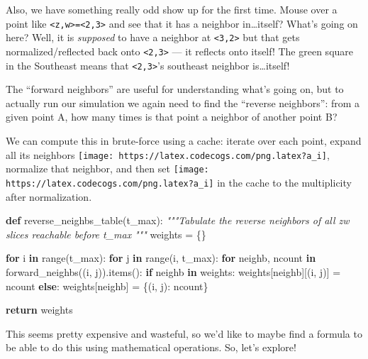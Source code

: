 \documentclass[]{article}
\newenvironment{Shaded}{}{}
\newcommand{\BuiltInTok}[1]{#1}
\newcommand{\CommentTok}[1]{\textcolor[rgb]{0.38,0.63,0.69}{\textit{#1}}}
\newcommand{\ControlFlowTok}[1]{\textcolor[rgb]{0.00,0.44,0.13}{\textbf{#1}}}
\newcommand{\KeywordTok}[1]{\textcolor[rgb]{0.00,0.44,0.13}{\textbf{#1}}}
\newcommand{\NormalTok}[1]{#1}
\newcommand{\OperatorTok}[1]{\textcolor[rgb]{0.40,0.40,0.40}{#1}}
\begin{document}
Also, we have something really odd show up for the first time. Mouse over a
point like \texttt{\textless{}z,w\textgreater{}=\textless{}2,3\textgreater{}}
and see that it has a neighbor in\ldots itself? What's going on here? Well, it
is \emph{supposed} to have a neighbor at \texttt{\textless{}3,2\textgreater{}}
but that gets normalized/reflected back onto
\texttt{\textless{}2,3\textgreater{}} --- it reflects onto itself! The green
square in the Southeast means that \texttt{\textless{}2,3\textgreater{}}'s
southeast neighbor is\ldots itself!

The ``forward neighbors'' are useful for understanding what's going on, but to
actually run our simulation we again need to find the ``reverse neighbors'':
from a given point A, how many times is that point a neighbor of another point
B?

We can compute this in brute-force using a cache: iterate over each point,
expand all its neighbors
\texttt{[image: https://latex.codecogs.com/png.latex?a\_i]}, normalize that
neighbor, and then set
\texttt{[image: https://latex.codecogs.com/png.latex?a\_i]} in the cache to the
multiplicity after normalization.

\begin{Shaded}
\begin{Highlighting}[]
\KeywordTok{def}\NormalTok{ reverse\_neighbs\_table(t\_max):}
    \CommentTok{"""Tabulate the reverse neighbors of all zw slices reachable before t\_max}
\CommentTok{    """}
\NormalTok{    weights }\OperatorTok{=}\NormalTok{ \{\}}

    \ControlFlowTok{for}\NormalTok{ i }\KeywordTok{in} \BuiltInTok{range}\NormalTok{(t\_max):}
        \ControlFlowTok{for}\NormalTok{ j }\KeywordTok{in} \BuiltInTok{range}\NormalTok{(i, t\_max):}
            \ControlFlowTok{for}\NormalTok{ neighb, ncount }\KeywordTok{in}\NormalTok{ forward\_neighbs((i, j)).items():}
                \ControlFlowTok{if}\NormalTok{ neighb }\KeywordTok{in}\NormalTok{ weights:}
\NormalTok{                    weights[neighb][(i, j)] }\OperatorTok{=}\NormalTok{ ncount}
                \ControlFlowTok{else}\NormalTok{:}
\NormalTok{                    weights[neighb] }\OperatorTok{=}\NormalTok{ \{(i, j): ncount\}}

    \ControlFlowTok{return}\NormalTok{ weights}
\end{Highlighting}
\end{Shaded}

This seems pretty expensive and wasteful, so we'd like to maybe find a formula
to be able to do this using mathematical operations. So, let's explore!
\end{document}
